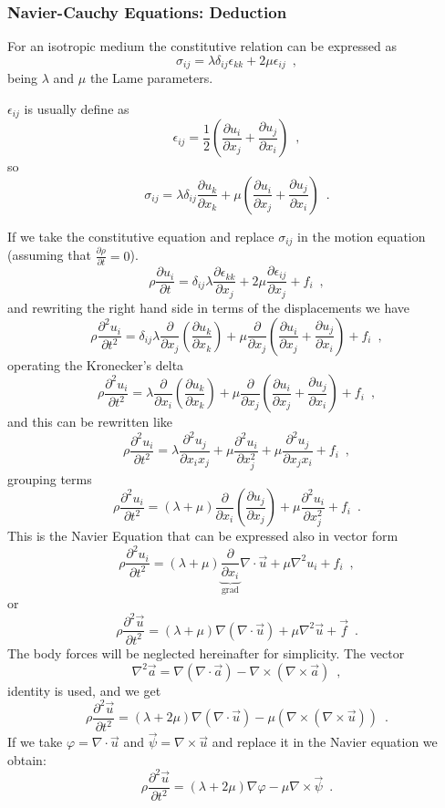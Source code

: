 \documentclass{beamer}
\newcommand{\pardiff}[2]{\frac{\partial #1}{\partial #2}}
\begin{document}
\begin{frame}[allowframebreaks]\frametitle{Navier-Cauchy Equations: Deduction}
For an isotropic medium the constitutive relation can be expressed as
\[\sigma_{ij} = \lambda \delta_{ij}\epsilon_{kk} + 2\mu \epsilon_{ij} \enspace ,\]
being $\lambda$ and $\mu$ the Lame parameters.

$\epsilon_{ij}$ is usually define as
\[\epsilon_{ij} = \frac{1}{2} \left( \pardiff{u_i}{x_j} + \pardiff{u_j}{x_i} \right) \enspace ,\]
so
\[\sigma_{ij} = \lambda \delta_{ij} \pardiff{u_k}{x_k} + \mu \left( \pardiff{u_i}{x_j} + \pardiff{u_j}{x_i} \right) \enspace .\]

If we take the constitutive equation and replace $\sigma_{ij}$ in the motion equation (assuming that $\pardiff{\rho}{t}=0$).
\[\rho \pardiff{u_i}{t} = \delta_{ij} \lambda \pardiff{\epsilon_{kk}}{x_j} + 2\mu \pardiff{\epsilon_{ij}}{x_j} +f_i \enspace ,\]
and rewriting the right hand side in terms of the displacements we have
\[\rho \pardiff{^2 u_i}{t^2} = \delta_{ij} \lambda \pardiff{}{x_j}\left( \pardiff{u_k}{x_k}\right) + \mu \pardiff{ }{x_j}\left( \pardiff{u_i}{x_j} + \pardiff{u_j}{x_i}\right) + f_i \enspace ,\]
operating the Kronecker's delta
\[\rho \pardiff{^2 u_i}{t^2} = \lambda \pardiff{}{x_i}\left( \pardiff{u_k}{x_k}\right) + \mu \pardiff{}{x_j}\left( \pardiff{u_i}{x_j} + \pardiff{u_j}{x_i} \right) + f_i \enspace ,\]
and this can be rewritten like
\[\rho \pardiff{^2 u_i}{t^2} = \lambda  \pardiff{^2 u_j}{x_i x_j} + \mu \pardiff{^2 u_i}{x_j^2} + \mu \pardiff{^2 u_j}{x_j x_i} + f_i \enspace ,\]
grouping terms
\begin{equation}
\rho \pardiff{^2 u_i}{t^2} = (\lambda + \mu)  \pardiff{}{x_i}\left( \pardiff{u_j}{x_j} \right) + \mu \pardiff{^2 u_i}{x_j^2}  + f_i \enspace .
\label{eq:navierInd}
\end{equation}
This is the Navier Equation that can be expressed also in vector form
\[\rho \pardiff{^2 u_i}{t^2} = (\lambda + \mu)  \underbrace{\pardiff{}{x_i}}_{\mbox{grad}}\nabla \cdot \vec{u} + \mu \nabla^2 u_i + f_i \enspace ,\]
or
\begin{equation}
\rho \pardiff{^2 \vec{u}}{t^2} = (\lambda + \mu)  \nabla (\nabla\cdot \vec{u})+ \mu \nabla^2 \vec{u} + \vec{f} \enspace .
\label{eq:navierVec}
\end{equation}
The body forces will be neglected hereinafter for simplicity. The vector 
\[\nabla^2 \vec{a} = \nabla (\nabla \cdot \vec{a}) - \nabla \times (\nabla \times \vec{a}) \enspace ,\]
identity is used, and we get
\[\rho \pardiff{^2 \vec{u}}{t^2} = (\lambda + 2\mu) \nabla(\nabla \cdot \vec{u}) - \mu (\nabla \times (\nabla \times \vec{u})) \enspace .\]
If we take $\varphi = \nabla \cdot \vec{u} $ and $\vec{\psi} = \nabla \times \vec{u}$ and replace it in the Navier equation we obtain:
\begin{equation}
\rho \pardiff{^2 \vec{u}}{t^2} = (\lambda + 2\mu) \nabla \varphi - \mu \nabla \times \vec{\psi} \enspace .
\label{eq:waveHelm}
\end{equation}
\end{frame} 
\end{document}
